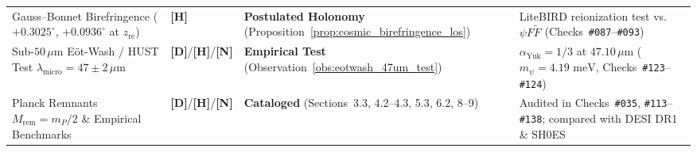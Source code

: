 \documentclass[11pt,a4paper]{article}
\newcommand{\catD}{\textbf{\textcolor{blue!75!black}{[D]}}}
\newcommand{\catH}{\textbf{\textcolor{orange!85!black}{[H]}}}
\newcommand{\catN}{\textbf{\textcolor{teal!75!black}{[N]}}}
\theoremstyle{plain}
\theoremstyle{definition}
\theoremstyle{remark}
\numberwithin{equation}{section}
\begin{document}
\begin{table}[H]
\begin{tabularx}{\textwidth}{@{} L{0.27\textwidth} C{0.12\textwidth} L{0.22\textwidth} Y @{}}
    \addlinespace[2.0pt]
    Gauss--Bonnet Birefringence ($+0.3025^\circ$, $+0.0936^\circ$ at $z_{\text{re}}$) & \catH & \textbf{Postulated Holonomy} (Proposition~\ref{prop:cosmic_birefringence_los}) & LiteBIRD reionization test vs.\ $\psi F\tilde{F}$ (Checks~\texttt{\#087}--\texttt{\#093}) \\
    \addlinespace[2.0pt]
    Sub-$50\,\mu\text{m}$ E\"ot-Wash / HUST Test $\lambda_{\text{micro}} = 47 \pm 2\,\mu\text{m}$ & \catD/\catH/\catN & \textbf{Empirical Test} (Observation~\ref{obs:eotwash_47um_test}) & $\alpha_{\text{Yuk}} = 1/3$ at $47.10\,\mu\text{m}$ ($m_{\psi} = 4.19\text{ meV}$, Checks~\texttt{\#123}--\texttt{\#124}) \cite{lee2020,tan2020_hust} \\
    \addlinespace[2.0pt]
    Planck Remnants $M_{\text{rem}} = m_P/2$ \& Empirical Benchmarks & \catD/\catH/\catN & \textbf{Cataloged} (Sections~3.3, 4.2--4.3, 5.3, 6.2, 8--9) & Audited in Checks~\texttt{\#035}, \texttt{\#113}--\texttt{\#138}; compared with DESI DR1 \& SH0ES \\
    \bottomrule
  \end{tabularx}
\end{table}
\end{document}
